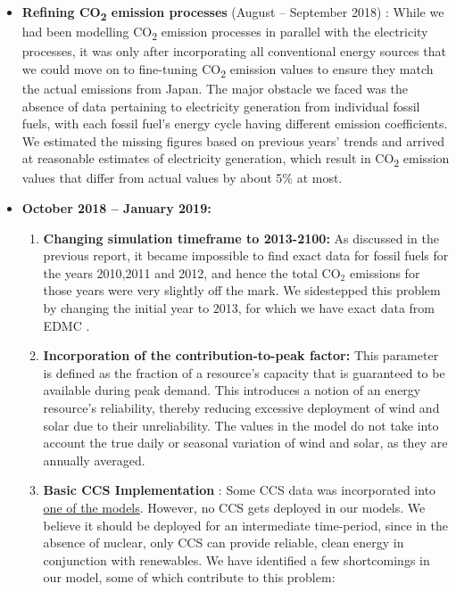 \documentclass[14pt,a4paper]{article} %
\begin{document}
\begin{itemize}
\item \textbf{Refining CO\textsubscript{2} emission processes} (August – September 2018) : While we had been modelling CO\textsubscript{2} emission processes in parallel with the electricity processes, it was only after incorporating all conventional energy sources that we could move on to fine-tuning CO\textsubscript{2} emission values to ensure they match the actual emissions from Japan. The major obstacle we faced was the absence of data pertaining to electricity generation from individual fossil fuels, with each fossil fuel's energy cycle having different emission coefficients. We estimated the missing figures based on previous years' trends \cite{noauthor_energy_2018} \cite{noauthor_national_2018} and arrived at reasonable estimates of electricity generation, which result in CO\textsubscript{2} emission values that differ from actual values by about 5\% at most.

\item \textbf{October 2018 – January 2019:}

\begin{enumerate}

\item \textbf{Changing simulation timeframe to 2013-2100:} As discussed in the previous report, it became impossible to find exact data for fossil fuels for the years 2010,2011 and 2012, and hence the total CO$_2$ emissions for those years were very slightly off the mark. We sidestepped this problem by changing the initial year to 2013, for which we have exact data from \gls{EDMC} \cite{noauthor_energy_2018}.\\

\item \textbf{Incorporation of the contribution-to-peak \cite{gargiulo_documentation_2005} factor:} This parameter is defined as the fraction of a resource's capacity that is guaranteed to be available during peak demand. This introduces a notion of an energy resource's reliability, thereby reducing excessive deployment of wind and solar due to their unreliability. The values in the model \cite{kato_energy_2016} do not take into account the true daily or seasonal variation of wind and solar, as they are annually averaged.\\

\item \textbf{Basic \gls{CCS} Implementation} : Some \gls{CCS} data \cite{kato_energy_2016}  was incorporated into \href{https://github.com/arfc/i2cner/tree/master/JPN-Main-Model/active/i2cner-nonuc}{one of the models}. However, no \gls{CCS} gets deployed in our models. We believe  it should be deployed for an intermediate time-period, since in the absence of nuclear, only \gls{CCS} can provide reliable, clean energy in conjunction with renewables. We have identified a few shortcomings in our model, some of which contribute to this problem:


\end{enumerate}
\end{itemize}
\end{document}
